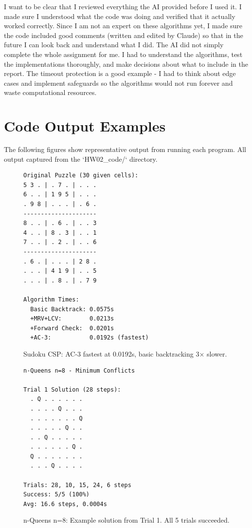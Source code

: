 \documentclass[letterpaper]{article}
\begin{document}
I want to be clear that I reviewed everything the AI provided before I used it. I made sure I understood what the code was doing and verified that it actually worked correctly. Since I am not an expert on these algorithms yet, I made sure the code included good comments (written and edited by Claude) so that in the future I can look back and understand what I did. The AI did not simply complete the whole assignment for me. I had to understand the algorithms, test the implementations thoroughly, and make decisions about what to include in the report. The timeout protection is a good example - I had to think about edge cases and implement safeguards so the algorithms would not run forever and waste computational resources.

\section{Code Output Examples}

The following figures show representative output from running each program. All output captured from the `HW02\_code/` directory.

\begin{figure}[h]
\begin{scriptsize}
\begin{verbatim}
Original Puzzle (30 given cells):
5 3 . | . 7 . | . . .
6 . . | 1 9 5 | . . .
. 9 8 | . . . | . 6 .
---------------------
8 . . | . 6 . | . . 3
4 . . | 8 . 3 | . . 1
7 . . | . 2 . | . . 6
---------------------
. 6 . | . . . | 2 8 .
. . . | 4 1 9 | . . 5
. . . | . 8 . | . 7 9

Algorithm Times:
  Basic Backtrack: 0.0575s
  +MRV+LCV:        0.0213s
  +Forward Check:  0.0201s
  +AC-3:           0.0192s (fastest)
\end{verbatim}
\end{scriptsize}
\caption{Sudoku CSP: AC-3 fastest at 0.0192s, basic backtracking 3× slower.}
\label{fig:sudoku-csp}
\end{figure}

\begin{figure}[h]
\begin{scriptsize}
\begin{verbatim}
n-Queens n=8 - Minimum Conflicts

Trial 1 Solution (28 steps):
  . Q . . . . . .
  . . . . Q . . .
  . . . . . . . Q
  . . . . . Q . .
  . . Q . . . . .
  . . . . . . Q .
  Q . . . . . . .
  . . . Q . . . .

Trials: 28, 10, 15, 24, 6 steps
Success: 5/5 (100%)
Avg: 16.6 steps, 0.0004s
\end{verbatim}
\end{scriptsize}
\caption{n-Queens n=8: Example solution from Trial 1. All 5 trials succeeded.}
\label{fig:nqueens-8}
\end{figure}
\end{document}
